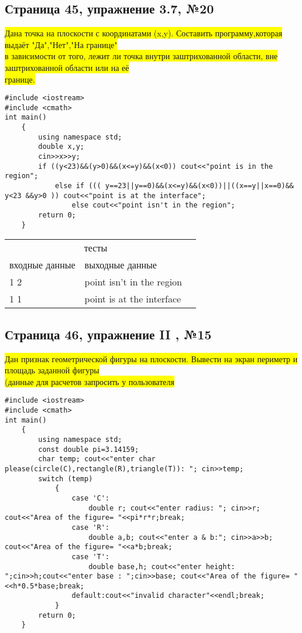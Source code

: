 \documentclass[11pt]{article}
\begin{document}
\begin{flushleft}
\newpage
\begin{center}
\section{Страница 45, упражнение 3.7, №20}
\colorbox{yellow}{Дана точка на плоскости с координатами (x,y). Составить программу,которая выдаёт "Да","Нет","На границе"}\\\colorbox{yellow}{ в зависимости от того, лежит ли точка внутри заштрихованной области, вне заштрихованной области или на её}\\\colorbox{yellow}{ границе.}
\end{center}
\begin{lstlisting}
#include <iostream>
#include <cmath>
int main()
	{
		using namespace std;
		double x,y;
		cin>>x>>y;
		if ((y<23)&&(y>0)&&(x<=y)&&(x<0)) cout<<"point is in the region";
		    else if ((( y==23||y==0)&&(x<=y)&&(x<0))||((x==y||x==0)&& y<23 &&y>0 )) cout<<"point is at the interface";
		        else cout<<"point isn't in the region";
		return 0;
	}
\end{lstlisting}

\begin{table}[h]\begin{center}\begin{tabular}{|l|l|l}
\cline{1-2}
\multicolumn{2}{|c|}{тесты} &  \\ \cline{1-2}
     входные данные      &       выходные данные    &  \\ \cline{1-2}
         1 2  &       point isn't in the region    &  \\ \cline{1-2}
                  1 1  &       point is at the interface    &  \\ \cline{1-2}
\end{tabular}\end{center}\end{table}

\newpage
\begin{center}
\section{Страница 46, упражнение II , №15}
\colorbox{yellow}{Дан признак геометрической фигуры на плоскости. Вывести на экран периметр и площадь заданной фигуры}\\\colorbox{yellow}{(данные для расчетов запросить у пользователя}
 \end{center}
\begin{lstlisting}
#include <iostream>
#include <cmath>
int main()
	{
		using namespace std;
		const double pi=3.14159;
		char temp; cout<<"enter char please(circle(C),rectangle(R),triangle(T)): "; cin>>temp;
		switch (temp) 
			{
			    case 'C':
			        double r; cout<<"enter radius: "; cin>>r; cout<<"Area of the figure= "<<pi*r*r;break;
			    case 'R':
			        double a,b; cout<<"enter a & b:"; cin>>a>>b; cout<<"Area of the figure= "<<a*b;break;
			    case 'T':
			        double base,h; cout<<"enter height: ";cin>>h;cout<<"enter base : ";cin>>base; cout<<"Area of the figure= "<<h*0.5*base;break;
			    default:cout<<"invalid character"<<endl;break;
			}
		return 0;
	}
\end{lstlisting}


\end{flushleft}
\end{document}

